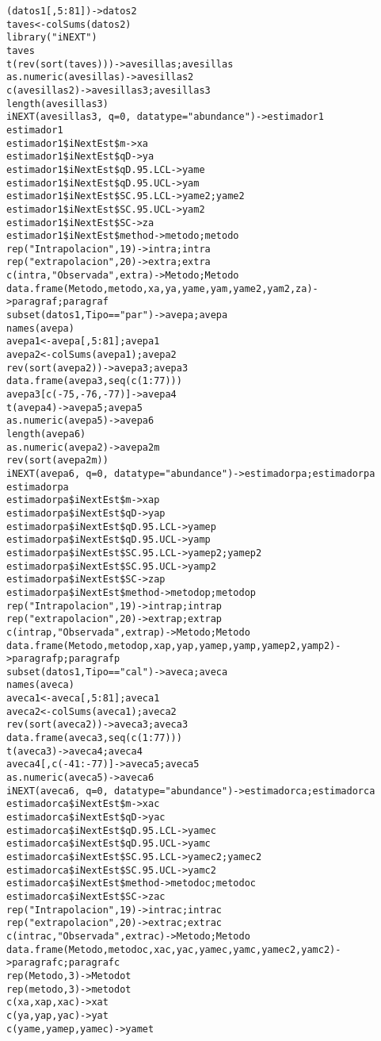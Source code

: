 \documentclass[letterpaper,12pt]{article}
\begin{document}
\begin{lstlisting}
(datos1[,5:81])->datos2
taves<-colSums(datos2)
library("iNEXT")
taves
t(rev(sort(taves)))->avesillas;avesillas
as.numeric(avesillas)->avesillas2
c(avesillas2)->avesillas3;avesillas3
length(avesillas3)
iNEXT(avesillas3, q=0, datatype="abundance")->estimador1
estimador1
estimador1$iNextEst$m->xa
estimador1$iNextEst$qD->ya
estimador1$iNextEst$qD.95.LCL->yame
estimador1$iNextEst$qD.95.UCL->yam
estimador1$iNextEst$SC.95.LCL->yame2;yame2
estimador1$iNextEst$SC.95.UCL->yam2
estimador1$iNextEst$SC->za
estimador1$iNextEst$method->metodo;metodo
rep("Intrapolacion",19)->intra;intra
rep("extrapolacion",20)->extra;extra
c(intra,"Observada",extra)->Metodo;Metodo
data.frame(Metodo,metodo,xa,ya,yame,yam,yame2,yam2,za)->paragraf;paragraf
subset(datos1,Tipo=="par")->avepa;avepa
names(avepa)
avepa1<-avepa[,5:81];avepa1
avepa2<-colSums(avepa1);avepa2
rev(sort(avepa2))->avepa3;avepa3
data.frame(avepa3,seq(c(1:77)))
avepa3[c(-75,-76,-77)]->avepa4
t(avepa4)->avepa5;avepa5
as.numeric(avepa5)->avepa6
length(avepa6)
as.numeric(avepa2)->avepa2m
rev(sort(avepa2m))
iNEXT(avepa6, q=0, datatype="abundance")->estimadorpa;estimadorpa
estimadorpa
estimadorpa$iNextEst$m->xap
estimadorpa$iNextEst$qD->yap
estimadorpa$iNextEst$qD.95.LCL->yamep
estimadorpa$iNextEst$qD.95.UCL->yamp
estimadorpa$iNextEst$SC.95.LCL->yamep2;yamep2
estimadorpa$iNextEst$SC.95.UCL->yamp2
estimadorpa$iNextEst$SC->zap
estimadorpa$iNextEst$method->metodop;metodop
rep("Intrapolacion",19)->intrap;intrap
rep("extrapolacion",20)->extrap;extrap
c(intrap,"Observada",extrap)->Metodo;Metodo
data.frame(Metodo,metodop,xap,yap,yamep,yamp,yamep2,yamp2)->paragrafp;paragrafp
subset(datos1,Tipo=="cal")->aveca;aveca
names(aveca)
aveca1<-aveca[,5:81];aveca1
aveca2<-colSums(aveca1);aveca2
rev(sort(aveca2))->aveca3;aveca3
data.frame(aveca3,seq(c(1:77)))
t(aveca3)->aveca4;aveca4
aveca4[,c(-41:-77)]->aveca5;aveca5
as.numeric(aveca5)->aveca6
iNEXT(aveca6, q=0, datatype="abundance")->estimadorca;estimadorca
estimadorca$iNextEst$m->xac
estimadorca$iNextEst$qD->yac
estimadorca$iNextEst$qD.95.LCL->yamec
estimadorca$iNextEst$qD.95.UCL->yamc
estimadorca$iNextEst$SC.95.LCL->yamec2;yamec2
estimadorca$iNextEst$SC.95.UCL->yamc2
estimadorca$iNextEst$method->metodoc;metodoc
estimadorca$iNextEst$SC->zac
rep("Intrapolacion",19)->intrac;intrac
rep("extrapolacion",20)->extrac;extrac
c(intrac,"Observada",extrac)->Metodo;Metodo
data.frame(Metodo,metodoc,xac,yac,yamec,yamc,yamec2,yamc2)->paragrafc;paragrafc
rep(Metodo,3)->Metodot
rep(metodo,3)->metodot
c(xa,xap,xac)->xat
c(ya,yap,yac)->yat
c(yame,yamep,yamec)->yamet

\end{lstlisting}
\end{document}
